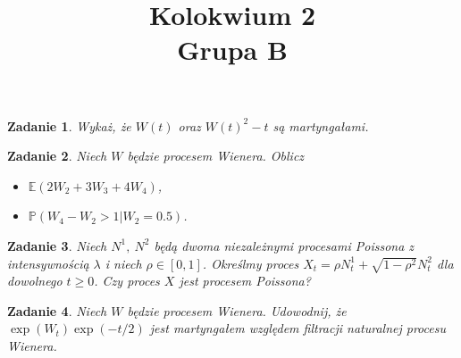 \documentclass{mwart}
\title{Kolokwium 2\\Grupa B}
\newtheorem{zd}{Zadanie}
\begin{document}

\maketitle

\begin{zd}
Wykaż, że $W(t)$ oraz $W(t)^2 - t$ są martyngałami.
\end{zd}

\begin{zd}
Niech $W$ będzie procesem Wienera. Oblicz
\begin{itemize}
\item $\mathbb{E}(2W_2+3W_3+4W_4)$,
\item $\mathbb{P}(W_4-W_2>1|W_2=0.5)$.
\end{itemize}
\end{zd}

\begin{zd}
Niech $N^1,\ N^2$ będą dwoma niezależnymi procesami Poissona z intensywnością $\lambda$ i niech $\rho \in [0, 1]$. Określmy proces $X_t = \rho N_t^1 + \sqrt{1 - \rho^2}N^2_t$ dla dowolnego $t\geq 0$. Czy proces $X$ jest procesem Poissona?
\end{zd}


\begin{zd}
Niech $W$ będzie procesem Wienera. Udowodnij, że $\exp(W_t)\exp(-t/2)$ jest martyngałem względem filtracji naturalnej procesu Wienera.
\end{zd}
\end{document}
